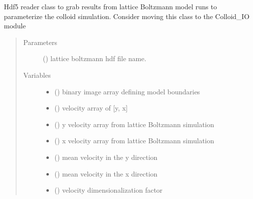 \documentclass[letterpaper,10pt,english]{sphinxmanual}
\begin{document}
\begin{fulllineitems}
\label{\detokenize{index:lb_colloids.Colloids.Colloid_Setup.Hdf5Reader}}
Hdf5 reader class to grab results from lattice Boltzmann model runs
to parameterize the colloid simulation. Consider moving this class to
the Colloid\_IO module
\begin{quote}\begin{description}
\item[{Parameters}] \leavevmode
{} () \textendash{} lattice boltzmann hdf file name.

\item[{Variables}] \leavevmode\begin{itemize}
\item {} 
 () \textendash{} binary image array defining model boundaries

\item {} 
 () \textendash{} velocity array of {[}y, x{]}

\item {} 
 () \textendash{} y velocity array from lattice Boltzmann simulation

\item {} 
 () \textendash{} x velocity array from lattice Boltzmann simulation

\item {} 
 () \textendash{} mean velocity in the y direction

\item {} 
 () \textendash{} mean velocity in the x direction

\item {} 
 () \textendash{} velocity dimensionalization factor

\end{itemize}

\end{description}\end{quote}

\end{fulllineitems}
\end{document}
